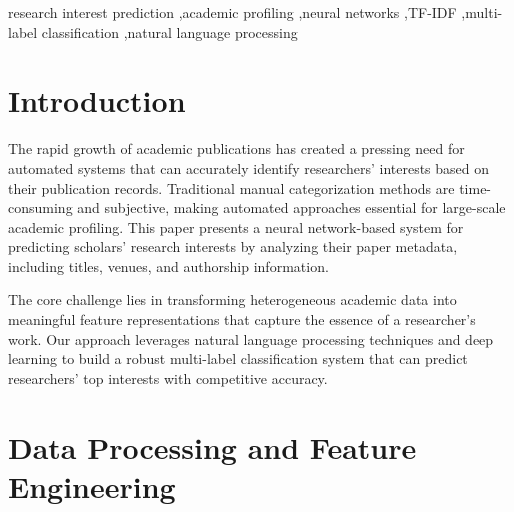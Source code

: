 \documentclass[preprint,12pt]{elsarticle}
\begin{document}
\begin{frontmatter}


\begin{keyword}
research interest prediction \sep academic profiling \sep neural networks \sep TF-IDF \sep multi-label classification \sep natural language processing
\end{keyword}

\end{frontmatter}


\section{Introduction}
\label{sec1}

The rapid growth of academic publications has created a pressing need for automated systems that can accurately identify researchers' interests based on their publication records. Traditional manual categorization methods are time-consuming and subjective, making automated approaches essential for large-scale academic profiling. This paper presents a neural network-based system for predicting scholars' research interests by analyzing their paper metadata, including titles, venues, and authorship information.

The core challenge lies in transforming heterogeneous academic data into meaningful feature representations that capture the essence of a researcher's work. Our approach leverages natural language processing techniques and deep learning to build a robust multi-label classification system that can predict researchers' top interests with competitive accuracy.

\section{Data Processing and Feature Engineering}
\label{sec2}
\end{document}

